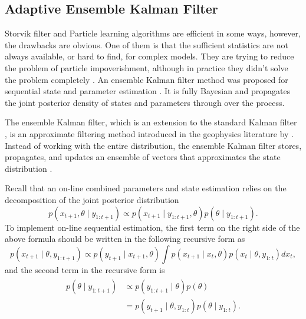 \subsection{Adaptive Ensemble Kalman Filter}

Storvik filter and Particle learning algorithms are efficient in some ways,  however, the drawbacks are obvious. One of them is that the sufficient statistics are not always available, or hard to find, for complex models. They are trying to reduce the problem of particle impoverishment, although in practice they didn't solve the problem completely \cite{chopin2010particle}. An ensemble Kalman filter method was proposed for sequential state and parameter estimation \cite{stroud2016bayesian}. It is fully Bayesian and propagates the joint posterior density of states and parameters through over the process. 


The ensemble Kalman filter, which is an extension to the standard Kalman filter \cite{kalman1960new}, is an approximate filtering method introduced in the geophysics literature by \cite{evensen1994sequential}. Instead of working with the entire distribution, the ensemble Kalman filter stores, propagates, and updates an ensemble of vectors that approximates the state distribution \cite{katzfuss2016understanding}. 


Recall that an on-line combined parameters and state estimation relies on the decomposition of the joint posterior distribution 
\begin{equation*}\label{jointposterior}
p(x_{t+1},\theta \mid y_{1:t+1}) \propto p(x_{t+1}\mid y_{1:t+1},\theta)p(\theta\mid y_{1:t+1}).
\end{equation*}
To implement on-line sequential estimation, the first term on the right side of the above formula should be written in the following recursive form as 
\begin{equation}\label{jointposteriorterm1}
p(x_{t+1}\mid \theta, y_{1:t+1}) \propto p(y_{t+1}\mid x_{t+1},\theta) \int p(x_{t+1}\mid x_{t},\theta) p(x_{t}\mid \theta, y_{1:t})dx_{t},
\end{equation}
and the second term in the recursive form is 
\begin{align}\label{jointposteriorterm2}
\begin{split}
p(\theta\mid y_{1:t+1}) & \propto p( y_{1:t+1}\mid\theta)p(\theta) \\
&= p(y_{t+1}\mid\theta,y_{1:t})p(\theta\mid y_{1:t}).
\end{split}
\end{align}


